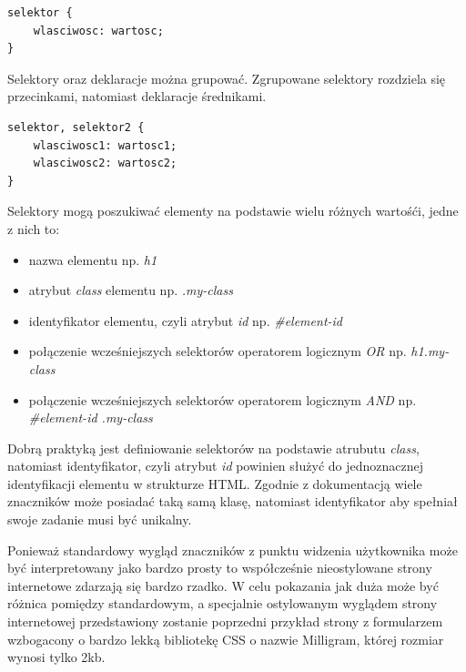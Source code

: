 \documentclass[polish, twoside, 12pt]{mwart}
\begin{document}
\begin{lstlisting}
selektor { 
	wlasciwosc: wartosc; 
}
\end{lstlisting}

Selektory oraz deklaracje można grupować. Zgrupowane selektory rozdziela się przecinkami, natomiast deklaracje średnikami.

\begin{lstlisting}
selektor, selektor2 { 
	wlasciwosc1: wartosc1;
	wlasciwosc2: wartosc2;
}
\end{lstlisting}

Selektory mogą poszukiwać elementy na podstawie wielu różnych wartośći, jedne z nich to:

\begin{itemize}
  \item nazwa elementu np. \emph{h1}
  \item atrybut \emph{class} elementu np. \emph{.my-class}
  \item identyfikator elementu, czyli atrybut \emph{id} np. \emph{\#element-id}
  \item połączenie wcześniejszych selektorów operatorem logicznym \emph{OR} np. \emph{h1.my-class}
  \item połączenie wcześniejszych selektorów operatorem logicznym \emph{AND} np. \emph{\#element-id .my-class}
\end{itemize}

Dobrą praktyką jest definiowanie selektorów na podstawie atrubutu \emph{class}, natomiast identyfikator, czyli atrybut \emph{id} powinien służyć do jednoznacznej identyfikacji elementu w strukturze HTML. Zgodnie z dokumentacją wiele znaczników może posiadać taką samą klasę, natomiast identyfikator aby spełniał swoje zadanie musi być unikalny.

Ponieważ standardowy wygląd znaczników z punktu widzenia użytkownika może być interpretowany jako bardzo prosty to współcześnie nieostylowane strony internetowe zdarzają się bardzo rzadko. W celu pokazania jak duża może być różnica pomiędzy standardowym, a specjalnie ostylowanym wyglądem strony internetowej przedstawiony zostanie poprzedni przykład strony z formularzem wzbogacony o bardzo lekką bibliotekę CSS o nazwie Milligram\cite{milligram}, której rozmiar wynosi tylko 2kb.
\end{document}
